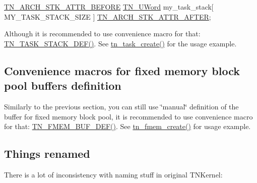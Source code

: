 \begin{DoxyCode}
\hyperlink{tn__arch__example_8h_ae245dddb19cd7c12b7038a62d576fafa}{TN\_ARCH\_STK\_ATTR\_BEFORE}
\hyperlink{tn__arch__example_8h_ab80cba0fe9ffcd9011d53dfeb9e39bf4}{TN\_UWord} my\_task\_stack[ MY\_TASK\_STACK\_SIZE ]
\hyperlink{tn__arch__example_8h_ab082613959b539182b8b47bc87d18d6a}{TN\_ARCH\_STK\_ATTR\_AFTER};
\end{DoxyCode}


Although it is recommended to use convenience macro for that\+: {\ttfamily \hyperlink{tn__tasks_8h_a120e01d9dddd21ac11827595e88d7c36}{T\+N\+\_\+\+T\+A\+S\+K\+\_\+\+S\+T\+A\+C\+K\+\_\+\+D\+E\+F()}}. See {\ttfamily \hyperlink{tn__tasks_8h_a548d5adda09d1b4e393b5df0e9e1a7a5}{tn\+\_\+task\+\_\+create()}} for the usage example.\hypertarget{tnkernel_diff_tnkernel_new_api__convenience_macros_fmem}{}\subsection{Convenience macros for fixed memory block pool buffers definition}\label{tnkernel_diff_tnkernel_new_api__convenience_macros_fmem}
Similarly to the previous section, you can still use \char`\"{}manual\char`\"{} definition of the buffer for fixed memory block pool, it is recommended to use convenience macro for that\+: {\ttfamily \hyperlink{tn__fmem_8h_ab45e9c2ad4a64345214f9a912bf76fc3}{T\+N\+\_\+\+F\+M\+E\+M\+\_\+\+B\+U\+F\+\_\+\+D\+E\+F()}}. See {\ttfamily \hyperlink{tn__fmem_8h_a56d47d4a1b6453d959336448a0ce96ac}{tn\+\_\+fmem\+\_\+create()}} for usage example.\hypertarget{tnkernel_diff_tnkernel_diff_api_rename}{}\subsection{Things renamed}\label{tnkernel_diff_tnkernel_diff_api_rename}
There is a lot of inconsistency with naming stuff in original T\+N\+Kernel\+:


